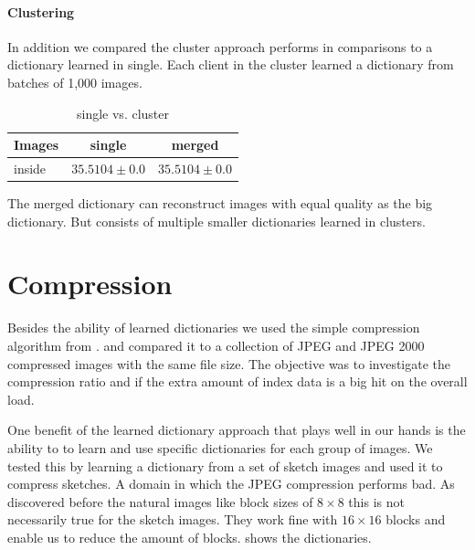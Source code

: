 \paragraph{Clustering}
In addition we compared the cluster approach performs in
comparisons to a dictionary learned in single. Each client in the cluster
learned a dictionary from batches of 1,000 images.

\begin{table}[h]
\centering
\begin{tabular}{| l | c | c |}
\hline\hline
Images & single & merged \\
\hline
inside & $35.5104 \pm 0.0$ & $35.5104 \pm 0.0$  \\
\hline
\end{tabular}
\caption{single vs. cluster}
\end{table}
The merged dictionary can reconstruct images with equal quality as the big
dictionary. But consists of multiple smaller dictionaries learned in clusters.


\newpage
\section{Compression}
Besides the ability of learned dictionaries 
we used the simple compression algorithm from .
and compared it to a collection of JPEG and JPEG 2000 compressed images with the
same file size. The objective was to investigate the compression ratio and if
the extra amount of index data is a big hit on the overall load.

One benefit of the learned dictionary approach that plays well in our
hands is the ability to to learn and use specific dictionaries for each group of
images. We tested this by learning a dictionary from a set of sketch images and
used it to compress sketches. A domain in which the JPEG compression performs
bad. As discovered before the natural images like block sizes of $8\times 8$
this is not necessarily true for the sketch images. They work fine with
$16\times 16$ blocks and enable us to reduce the amount of blocks.
 shows the dictionaries. 



